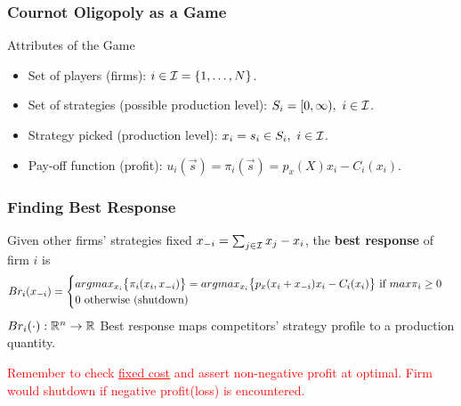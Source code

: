\documentclass[]{article}
\begin{document}
            \subsubsection{Cournot Oligopoly as a Game}
                \begin{remark} Attributes of the Game
                    \begin{itemize}
                        \item Set of players (firms): $i \in \mathcal{{I}} = \{1,\dots,N\}$.
                        \item Set of strategies (possible production level): $S_i = [0, \infty),\ i \in \mathcal{{I}}$.
                        \item Strategy picked (production level): $x_i = s_i \in S_i,\ i \in \mathcal{{I}}$.
                        \item Pay-off function (profit): $u_i(\vec{s}) = \pi_i(\vec{s}) = p_x(X)x_i - C_i(x_i)$.
                    \end{itemize}
                \end{remark}
            
            \subsubsection{Finding Best Response}
                \begin{definition}
                    Given other firms' strategies fixed $x_{-i} = \sum_{j \in \mathcal{{I}}}{x_j} - x_i$, the \textbf{best response} of firm $i$ is 
                    \[
                        Br_i(x_{-i}) = 
                        \begin{cases}
                            argmax_{x_i} \big \{ {\pi_i(x_i, x_{-i})} \big \}
                            = argmax_{x_i} \big \{ {p_x(x_i+x_{-i})x_i - C_i(x_i) \big \}
                            \text{{ if }} max{\pi_i}} \geq 0\\
                            0 \text{{ otherwise (shutdown)}} \\
                        \end{cases}
                    \]
                    $Br_i(\cdot): \mathbb{R}^n \rightarrow \mathbb{R}$ Best response maps competitors' strategy profile to a production quantity.
                \end{definition}
                
                \textcolor{red}{
                \begin{remark}
                    Remember to check \ul{fixed cost} and assert non-negative profit at optimal. Firm would shutdown if negative profit(loss) is encountered.
                \end{remark}
                }
                
\end{document}
